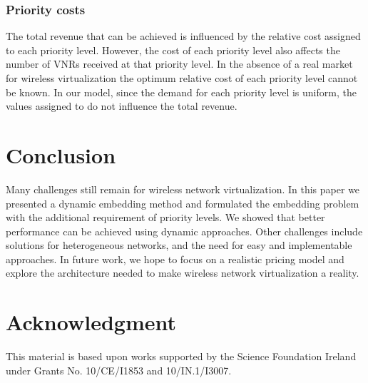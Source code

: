 \documentclass[conference]{IEEEtran}
\begin{document}
\subsubsection{Priority costs}
The total revenue that can be achieved is influenced by the relative cost assigned to each priority level. However, the cost of each priority level also affects the number of VNRs received at that priority level. In the absence of a real market for wireless virtualization the optimum relative cost of each priority level cannot be known. In our model, since the demand for each priority level is uniform, the values assigned to  do not influence the total revenue.





\section{Conclusion}
\label{sect:conclusion}
Many challenges still remain for wireless network virtualization. In this paper we presented a dynamic embedding method and formulated the embedding problem with the additional requirement of priority levels. We showed that better performance can be achieved using dynamic approaches.
Other challenges include solutions for heterogeneous networks, and the need for easy and implementable approaches. In future work, we hope to focus on a realistic pricing model and explore the architecture needed to make wireless network virtualization a reality.


\section*{Acknowledgment}

This material is based upon works supported by the Science Foundation
Ireland under Grants No. 10/CE/I1853 and 10/IN.1/I3007.


































\end{document}
